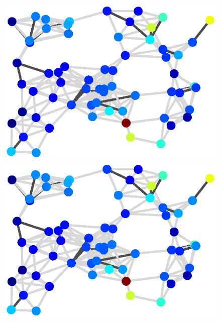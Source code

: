 \begin{figure}[t]
\begin{center}
\begin{minipage}{0.95\textwidth}
\begin{minipage}[t]{0.17\textwidth}
            \end{minipage}\hspace{0.3em}
            \begin{minipage}[t]{0.17\textwidth}
                \centering
                \includegraphics[width=\linewidth]{figures/restored/gtv}
            \end{minipage}\hspace{0.3em}
            \begin{minipage}[t]{0.17\textwidth}
                \centering
                \includegraphics[width=\linewidth]{figures/restored/proposed_1}
            \end{minipage}\hspace{0.3em}
            \begin{minipage}[t]{0.17\textwidth}

\end{minipage}
\end{minipage}
\end{center}
\end{figure}
